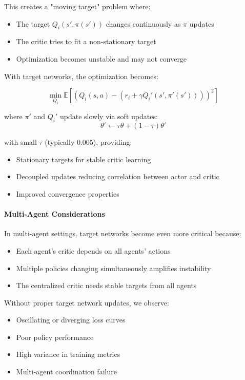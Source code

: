 \documentclass[conference]{IEEEtran}
\begin{document}
{{This creates a "moving target" problem where:
\begin{itemize}
    \item The target $Q_i(s', \pi(s'))$ changes continuously as $\pi$ updates
    \item The critic tries to fit a non-stationary target
    \item Optimization becomes unstable and may not converge
\end{itemize}

With target networks, the optimization becomes:

\begin{equation}
\min_{Q_i} \mathbb{E}[(Q_i(s,a) - (r_i + \gamma Q_i'(s', \pi'(s'))))^2]
\end{equation}

where $\pi'$ and $Q_i'$ update slowly via soft updates:
\begin{equation}
\theta' \leftarrow \tau\theta + (1-\tau)\theta'
\end{equation}

with small $\tau$ (typically 0.005), providing:
\begin{itemize}
    \item Stationary targets for stable critic learning
    \item Decoupled updates reducing correlation between actor and critic
    \item Improved convergence properties
\end{itemize}

\paragraph{Multi-Agent Considerations}

In multi-agent settings, target networks become even more critical because:
\begin{itemize}
    \item Each agent's critic depends on all agents' actions
    \item Multiple policies changing simultaneously amplifies instability
    \item The centralized critic needs stable targets from all agents
\end{itemize}

Without proper target network updates, we observe:
\begin{itemize}
    \item Oscillating or diverging loss curves
    \item Poor policy performance
    \item High variance in training metrics
    \item Multi-agent coordination failure
\end{itemize}

}}
\end{document}
